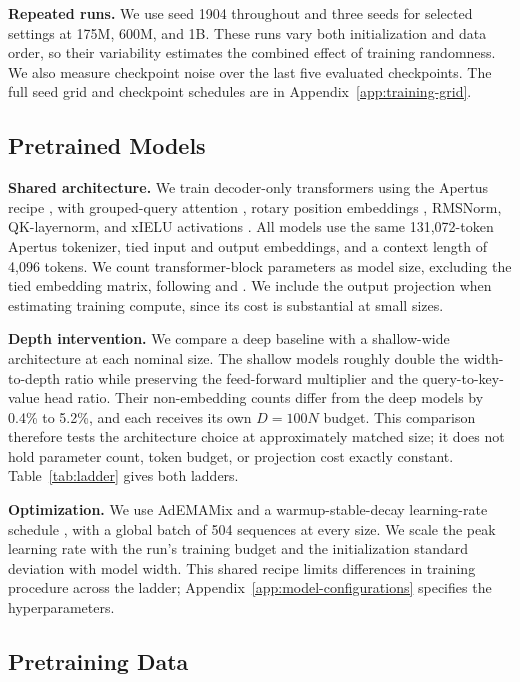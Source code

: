 \textbf{Repeated runs.} We use seed 1904 throughout and three seeds for selected settings at 175M, 600M, and 1B. These runs vary both initialization and data order, so their variability estimates the combined effect of training randomness. We also measure checkpoint noise over the last five evaluated checkpoints. The full seed grid and checkpoint schedules are in Appendix~\ref{app:training-grid}.

\subsection{Pretrained Models}
\label{subsec:models}

\textbf{Shared architecture.} We train decoder-only transformers using the Apertus recipe \citep{apertus_apertus_2025}, with grouped-query attention \citep{ainslie_gqa_2023}, rotary position embeddings \citep{su_roformer_2023}, RMSNorm, QK-layernorm, and xIELU activations \citep{huang_xielu_2025}. All models use the same 131,072-token Apertus tokenizer, tied input and output embeddings, and a context length of 4,096 tokens. We count transformer-block parameters as model size, excluding the tied embedding matrix, following \citet{bhagia_establishing_2024} and \citet{heineman_signal_2025}. We include the output projection when estimating training compute, since its cost is substantial at small sizes.

\textbf{Depth intervention.} We compare a deep baseline with a shallow-wide architecture at each nominal size. The shallow models roughly double the width-to-depth ratio while preserving the feed-forward multiplier and the query-to-key-value head ratio. Their non-embedding counts differ from the deep models by 0.4\% to 5.2\%, and each receives its own $D=100N$ budget. This comparison therefore tests the architecture choice at approximately matched size; it does not hold parameter count, token budget, or projection cost exactly constant. Table~\ref{tab:ladder} gives both ladders.

\textbf{Optimization.} We use AdEMAMix \citep{pagliardini_ademamix_2024} and a warmup-stable-decay learning-rate schedule \citep{hagele_scaling_2024}, with a global batch of 504 sequences at every size. We scale the peak learning rate with the run's training budget and the initialization standard deviation with model width. This shared recipe limits differences in training procedure across the ladder; Appendix~\ref{app:model-configurations} specifies the hyperparameters.

\subsection{Pretraining Data}
\label{subsec:data}

